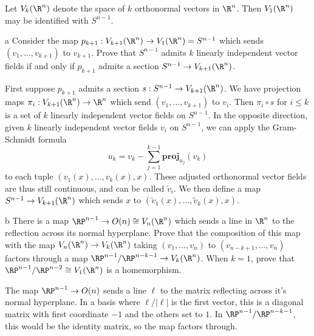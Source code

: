 \documentclass[11pt,letterpaper]{article}
\begin{document}
\begin{solution}
    \quad Let $V_k(\R^n)$ denote the space of $k$ orthonormal vectors in $\R^n$. Then $V_1(\R^n)$ may be identified with $S^{n-1}$.
    \begin{partproblem}{a}
        Consider the map $p_{k+1} : V_{k+1}(\R^n) \to V_1(\R^n)=S^{n-1}$ which sends $(v_1,\ldots,v_{k+1})$ to $v_{k+1}$. Prove that $S^{n-1}$ admits $k$ linearly independent vector fields if and only if $p_{k+1}$ admits a section $S^{n-1}\to V_{k+1}(\R^n)$. %
    \end{partproblem}

    \quad First suppose $p_{k+1}$ admits a section $s : S^{n-1}\to V_{k+1}(\R^n)$. We have projection maps $\pi_i : V_{k+1}(\R^n) \to \R^n$ which send $(v_1,\ldots,v_{k+1})$ to $v_i$. Then $\pi_i\circ s$ for $i\leq k$ is a set of $k$ linearly independent vector fields on $S^{n-1}$. In the opposite direction, given $k$ linearly independent vector fields $v_i$ on $S^{n-1}$, we can apply the Gram-Schmidt formula
    \[
        u_k = v_k - \sum^{k-1}_{j=1} \textbf{proj}_{u_j}(v_k)
    \]
    to each tuple $(v_1(x),\ldots,v_k(x),x)$. These adjusted orthonormal vector fields are thus still continuous, and can be called $\widetilde{v}_i$. We then define a map $S^{n-1} \to V_{k+1}(\R^n)$ which sends $x$ to $(\widetilde{v}_1(x), \ldots,\widetilde{v}_k(x), x)$. 

    \begin{partproblem}{b}
        There is a map $\RP^{n-1} \to O(n)\cong V_n(\R^n)$ which sends a line in $\R^n$ to the reflection across its normal hyperplane. Prove that the composition of this map with the map $V_n(\R^n)\to V_k(\R^n)$ taking $(v_1,\ldots,v_n)$ to $(v_{n-k+1}, \ldots, v_n)$ factors through a map $\RP^{n-1} / \RP^{n-k-1} \to V_k(\R^n)$. When $k=1$, prove that $\RP^{n-1} / \RP^{n-2} \cong V_1(\R^n)$ is a homemorphism.
    \end{partproblem}

    \quad The map $\RP^{n-1} \to O(n)$ sends a line $\ell$ to the matrix reflecting across it's normal hyperplane. In a basis where $\ell/|\ell|$ is the first vector, this is a diagonal matrix with first coordinate $-1$ and the others set to $1$. In $\RP^{n-1} / \RP^{n-k-1}$, this would be the identity matrix, so the map factors through.


\end{solution}
\end{document}
